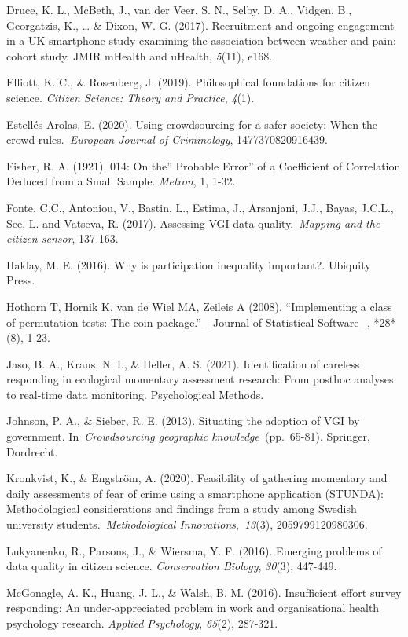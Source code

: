 \documentclass[
]{article}
\begin{document}
Druce, K. L., McBeth, J., van der Veer, S. N., Selby, D. A., Vidgen, B.,
Georgatzis, K., \ldots{} \& Dixon, W. G. (2017). Recruitment and ongoing
engagement in a UK smartphone study examining the association between
weather and pain: cohort study. JMIR mHealth and uHealth, \emph{5}(11),
e168.

Elliott, K. C., \& Rosenberg, J. (2019). Philosophical foundations for
citizen science. \emph{Citizen Science: Theory and Practice},
\emph{4}(1).

Estellés-Arolas, E. (2020). Using crowdsourcing for a safer society:
When the crowd rules.~\emph{European Journal of Criminology},
1477370820916439.

Fisher, R. A. (1921). 014: On the'' Probable Error'' of a Coefficient of
Correlation Deduced from a Small Sample. \emph{Metron}, 1, 1-32.

Fonte, C.C., Antoniou, V., Bastin, L., Estima, J., Arsanjani, J.J.,
Bayas, J.C.L., See, L. and Vatseva, R. (2017). Assessing VGI data
quality.~\emph{Mapping and the citizen sensor}, 137-163.

Haklay, M. E. (2016). Why is participation inequality important?.
Ubiquity Press.

Hothorn T, Hornik K, van de Wiel MA, Zeileis A (2008). ``Implementing a
class of permutation tests: The coin package.'' \_Journal of Statistical
Software\_, *28*(8), 1-23.

Jaso, B. A., Kraus, N. I., \& Heller, A. S. (2021). Identification of
careless responding in ecological momentary assessment research: From
posthoc analyses to real-time data monitoring. Psychological Methods.

Johnson, P. A., \& Sieber, R. E. (2013). Situating the adoption of VGI
by government. In~\emph{Crowdsourcing geographic knowledge}~(pp.~65-81).
Springer, Dordrecht.

Kronkvist, K., \& Engström, A. (2020). Feasibility of gathering
momentary and daily assessments of fear of crime using a smartphone
application (STUNDA): Methodological considerations and findings from a
study among Swedish university students.~\emph{Methodological
Innovations},~\emph{13}(3), 2059799120980306.

Lukyanenko, R., Parsons, J., \& Wiersma, Y. F. (2016). Emerging problems
of data quality in citizen science. \emph{Conservation Biology},
\emph{30}(3), 447-449.

McGonagle, A. K., Huang, J. L., \& Walsh, B. M. (2016). Insufficient
effort survey responding: An under‐appreciated problem in work and
organisational health psychology research. \emph{Applied Psychology},
\emph{65}(2), 287-321.
\end{document}
